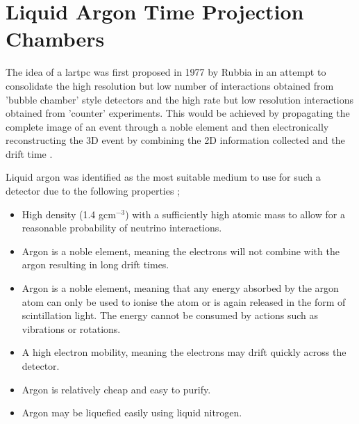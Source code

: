 \section{Liquid Argon Time Projection Chambers}\label{sec:lartpc}

The idea of a \gls{lartpc} was first proposed in 1977 by Rubbia in an attempt to consolidate the high resolution but low number of interactions obtained from 'bubble chamber' style detectors and the high rate but low resolution interactions obtained from 'counter' experiments. This would be achieved by propagating the complete image of an event through a noble element and then electronically reconstructing the 3D event by combining the 2D information collected and the drift time \cite{LArTPC_proposal}.

Liquid argon was identified as the most suitable medium to use for such a detector due to the following properties \cite{LArTPC_proposal}; 
\begin{itemize}
    \item High density (1.4 gcm$^{-3}$) with a sufficiently high atomic mass to allow for a reasonable probability of neutrino interactions.
    \item Argon is a noble element, meaning the electrons will not combine with the argon resulting in long drift times.
    \item Argon is a noble element, meaning that any energy absorbed by the argon atom can only be used to ionise the atom or is again released in the form of scintillation light. The energy cannot be consumed by actions such as vibrations or rotations. 
    \item A high electron mobility, meaning the electrons may drift quickly across the detector.
    \item Argon is relatively cheap and easy to purify.
    \item Argon may be liquefied easily using liquid nitrogen. 
\end{itemize}

